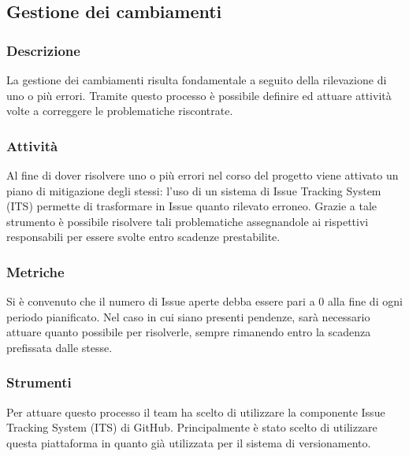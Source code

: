 \subsection{Gestione dei cambiamenti}
	
	\subsubsection{Descrizione}
		La gestione dei cambiamenti risulta fondamentale a seguito della rilevazione di uno o più errori. Tramite questo processo è possibile definire ed attuare attività volte a correggere le problematiche riscontrate.
	
	
	\subsubsection{Attività}
			Al fine di dover risolvere uno o più errori nel corso del progetto viene attivato un piano di mitigazione degli stessi: l'uso di un sistema di Issue Tracking System (ITS) permette di trasformare in Issue quanto rilevato erroneo. Grazie a tale strumento è possibile risolvere tali problematiche assegnandole ai rispettivi responsabili per essere svolte entro scadenze prestabilite.
	
	
	\subsubsection{Metriche}
			Si è convenuto che il numero di Issue aperte debba essere pari a 0 alla fine di ogni periodo pianificato. Nel caso in cui siano presenti pendenze, sarà necessario attuare quanto possibile per risolverle, sempre rimanendo entro la scadenza prefissata dalle stesse.
			
			
	\subsubsection{Strumenti}
			Per attuare questo processo il team ha scelto di utilizzare la componente Issue Tracking System (ITS) di GitHub. Principalmente è stato scelto di utilizzare questa piattaforma in quanto già utilizzata per il sistema di versionamento.